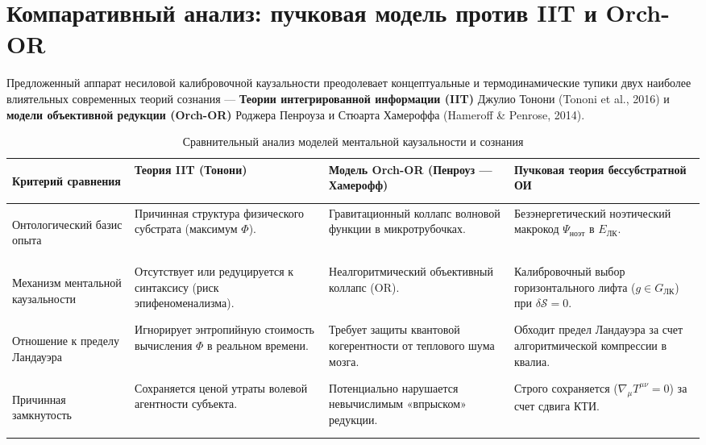 \documentclass[12pt,a4paper]{article}
\begin{document}
\section{Компаративный анализ: пучковая модель против IIT и Orch-OR}

Предложенный аппарат несиловой калибровочной каузальности преодолевает концептуальные и термодинамические тупики двух наиболее влиятельных современных теорий сознания --- \textbf{Теории интегрированной информации (IIT)} Джулио Тонони (Tononi et al., 2016) и \textbf{модели объективной редукции (Orch-OR)} Роджера Пенроуза и Стюарта Хамероффа (Hameroff \& Penrose, 2014).

\begin{table}[htbp]
\centering
\caption{Сравнительный анализ моделей ментальной каузальности и сознания}
\label{tab:comparison}
\begin{tabularx}{\textwidth}{
  >{\bfseries\raggedright\arraybackslash\hspace{0pt}}X
  >{\raggedright\arraybackslash\hspace{0pt}}X
  >{\raggedright\arraybackslash\hspace{0pt}}X
  >{\raggedright\arraybackslash\hspace{0pt}}X
}
\toprule
Критерий сравнения & Теория IIT (Тонони) & Модель Orch-OR (Пенроуз --- Хамерофф) & Пучковая теория бессубстратной ОИ \\
\midrule
Онтологический базис опыта & Причинная структура физического субстрата (максимум $\Phi$). & Гравитационный коллапс волновой функции в микротрубочках. & Безэнергетический ноэтический макрокод $\Psi_{\text{ноэт}}$ в $E_{\text{ЛК}}$. \\
\addlinespace
Механизм ментальной каузальности & Отсутствует или редуцируется к синтаксису (риск эпифеноменализма). & Неалгоритмический объективный коллапс ($\text{OR}$). & Калибровочный выбор горизонтального лифта ($g \in G_{\text{ЛК}}$) при $\delta \mathcal{S} = 0$. \\
\addlinespace
Отношение к пределу Ландауэра & Игнорирует энтропийную стоимость вычисления $\Phi$ в реальном времени. & Требует защиты квантовой когерентности от теплового шума мозга. & Обходит предел Ландауэра за счет алгоритмической компрессии в квалиа. \\
\addlinespace
Причинная замкнутость & Сохраняется ценой утраты волевой агентности субъекта. & Потенциально нарушается невычислимым «впрыском» редукции. & Строго сохраняется ($\nabla_\mu T^{\mu\nu} = 0$) за счет сдвига КТИ. \\
\bottomrule
\end{tabularx}
\end{table}
\end{document}
